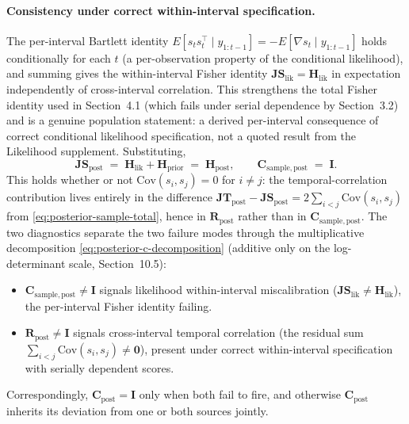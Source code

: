 \documentclass[11pt]{article}
\begin{document}
\paragraph{Consistency under correct within-interval specification.}
The per-interval Bartlett identity $E[s_t s_t^\top \mid y_{1:t-1}] = -E[\nabla s_t \mid y_{1:t-1}]$ holds conditionally for each $t$ (a per-observation property of the conditional likelihood), and summing gives the within-interval Fisher identity $\mathbf{JS}_{\mathrm{lik}} = \mathbf H_{\mathrm{lik}}$ in expectation independently of cross-interval correlation. This strengthens the total Fisher identity used in Section~4.1 (which fails under serial dependence by Section~3.2) and is a genuine population statement: a derived per-interval consequence of correct conditional likelihood specification, not a quoted result from the Likelihood supplement. Substituting,
\begin{equation}
\mathbf{JS}_{\mathrm{post}}
\;=\;
\mathbf H_{\mathrm{lik}} + \mathbf H_{\mathrm{prior}}
\;=\;
\mathbf H_{\mathrm{post}},
\qquad
\mathbf C_{\mathrm{sample},\mathrm{post}}
\;=\;
\mathbf I.
\label{eq:posterior-c-sample-identity}
\end{equation}
This holds whether or not $\mathrm{Cov}(s_i, s_j) = 0$ for $i \neq j$: the temporal-correlation contribution lives entirely in the difference $\mathbf{JT}_{\mathrm{post}} - \mathbf{JS}_{\mathrm{post}} = 2\sum_{i<j}\mathrm{Cov}(s_i, s_j)$ from \eqref{eq:posterior-sample-total}, hence in $\mathbf R_{\mathrm{post}}$ rather than in $\mathbf C_{\mathrm{sample},\mathrm{post}}$. The two diagnostics separate the two failure modes through the multiplicative decomposition \eqref{eq:posterior-c-decomposition} (additive only on the log-determinant scale, Section~10.5):
\begin{itemize}
\item $\mathbf C_{\mathrm{sample},\mathrm{post}} \neq \mathbf I$ signals likelihood within-interval miscalibration ($\mathbf{JS}_{\mathrm{lik}} \neq \mathbf H_{\mathrm{lik}}$), the per-interval Fisher identity failing.
\item $\mathbf R_{\mathrm{post}} \neq \mathbf I$ signals cross-interval temporal correlation (the residual sum $\sum_{i<j}\mathrm{Cov}(s_i, s_j) \neq \mathbf 0$), present under correct within-interval specification with serially dependent scores.
\end{itemize}
Correspondingly, $\mathbf C_{\mathrm{post}} = \mathbf I$ only when both fail to fire, and otherwise $\mathbf C_{\mathrm{post}}$ inherits its deviation from one or both sources jointly.
\end{document}
